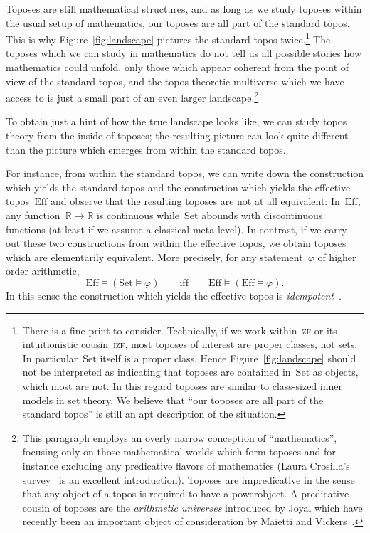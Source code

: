 \documentclass[oneside,reqno]{amsart}
\theoremstyle{definition}
\theoremstyle{plain}
\theoremstyle{remark}
\newcommand{\RR}{\mathbb{R}}
\newcommand{\Set}{\mathrm{Set}}
\newcommand{\Eff}{\mathrm{Ef{}f}}
\renewcommand{\_}{\mathpunct{.}\,}
\newcommand{\effective}{ef{}fective\xspace}
\newcommand{\?}{\,{:}\,}
\begin{document}
Toposes are still mathematical structures, and as long as we study
toposes within the usual setup of mathematics, our toposes are all part of the
standard topos. This is why Figure~\ref{fig:landscape} pictures the standard
topos twice.\footnote{There is a fine print to consider. Technically, if we
work within~\textsc{zf} or its intuitionistic cousin~\textsc{izf}, most toposes
of interest are proper classes, not sets. In particular~$\Set$ itself is a
proper class. Hence Figure~\ref{fig:landscape} should not be interpreted as
indicating that toposes are contained in~$\Set$ as objects, which most are not.
In this regard toposes are similar to class-sized inner models in set theory.
We believe that ``our toposes are all part of the standard topos'' is still an
apt description of the situation.}
The toposes which we can study in mathematics do not tell us
all possible stories how mathematics could unfold, only those which appear
coherent from the point of view of the standard topos, and the topos-theoretic
multiverse which we have access to is just a small part of an even larger
landscape.\footnote{This paragraph employs an overly narrow conception of
``mathematics'', focusing only on those mathematical worlds which form toposes
and for instance excluding any predicative flavors of mathematics
(Laura Crosilla's survey~\cite{crosilla:predicativity} is an excellent introduction).
Toposes are impredicative in the sense that any object of a topos is required to have a
powerobject. A predicative cousin of toposes are the \emph{arithmetic
universes} introduced by Joyal which have recently been an important object of
consideration by Maietti and
Vickers~\cite{maietti:au,maietti-vickers:induction,vickers:sketches}.}

To obtain just a hint of how the true landscape looks like, we can study topos
theory from the inside of toposes; the resulting picture can look quite
different than the picture which emerges from within the standard topos.

For instance, from within the standard topos, we can write down the
construction which yields the standard topos and the construction which yields
the \effective topos~$\Eff$ and observe that the resulting toposes are not at
all equivalent: In~$\Eff$, any function~$\RR \to \RR$ is continuous
while~$\Set$ abounds with discontinuous functions (at least if we assume a
classical meta level). In contrast, if we carry out these two constructions
from within the \effective topos, we obtain toposes which are elementarily
equivalent. More precisely, for any statement~$\varphi$ of higher order
arithmetic,
\[ \Eff \models (\Set \models \varphi) \qquad\text{iff}\qquad\Eff \models
  (\Eff \models \varphi). \]
In this sense the construction which yields the \effective topos is
\emph{idempotent}~\cite[Section~3.8.3]{oosten:realizability}.
\end{document}
